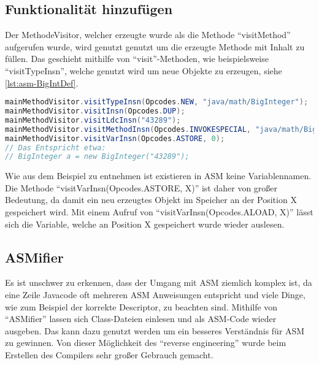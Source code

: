 \subsection{Funktionalität hinzufügen}

Der MethodeVisitor, welcher erzeugte wurde als die Methode \enquote{visitMethod} aufgerufen wurde, wird genutzt genutzt um die erzeugte Methode mit Inhalt zu füllen. Das geschieht mithilfe von \enquote{visit}-Methoden, wie beispielsweise \enquote{visitTypeInsn}, welche genutzt wird um neue Objekte zu erzeugen, siehe \cref{lst:asm-BigIntDef}.

\begin{lstlisting}[language=Java, caption=Erzeugen eines BigIntegers mit ASM, label={lst:asm-BigIntDef}]
mainMethodVisitor.visitTypeInsn(Opcodes.NEW, "java/math/BigInteger");
mainMethodVisitor.visitInsn(Opcodes.DUP);
mainMethodVisitor.visitLdcInsn("43289");
mainMethodVisitor.visitMethodInsn(Opcodes.INVOKESPECIAL, "java/math/BigInteger", "<init>", "(Ljava/lang/String;)V", false);
mainMethodVisitor.visitVarInsn(Opcodes.ASTORE, 0);
// Das Entspricht etwa:
// BigInteger a = new BigInteger("43289");
\end{lstlisting}

Wie aus dem Beispiel zu entnehmen ist existieren in ASM keine Variablennamen. Die Methode \enquote{visitVarInsn(Opcodes.ASTORE, X)} ist daher von großer Bedeutung, da damit ein neu erzeugtes Objekt im Speicher an der Position X gespeichert wird. Mit einem Aufruf von \enquote{visitVarInsn(Opcodes.ALOAD, X)} lässt sich die Variable, welche an Position X gespeichert wurde wieder auslesen.

\subsection{ASMifier} \label{subsec:asmifer}
Es ist unschwer zu erkennen, dass der Umgang mit ASM ziemlich komplex ist, da eine Zeile Javacode oft mehreren ASM Anweisungen entspricht und viele Dinge, wie zum Beispiel der korrekte Descriptor, zu beachten sind. Mithilfe von \enquote{ASMifier} lassen sich Class-Dateien einlesen und als ASM-Code wieder ausgeben. Das kann dazu genutzt werden um ein besseres Verständnis für ASM zu gewinnen. Von dieser Möglichkeit des \enquote{reverse engineering} wurde beim Erstellen des Compilers sehr großer Gebrauch gemacht.

